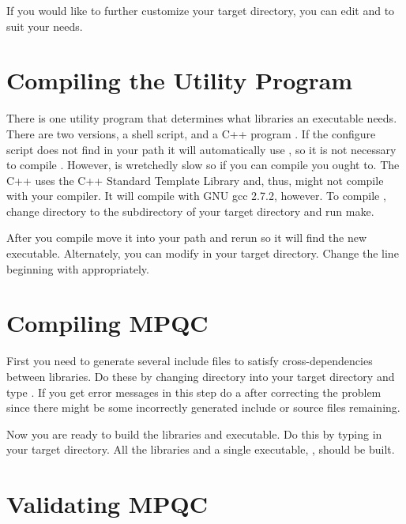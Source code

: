  If you would like to further customize your target directory,
you can edit  and  to
suit your needs.

\section{Compiling the Utility Program}

 There is one utility program that determines what libraries an executable
needs.  There are two versions, a shell script,  and a
C++ program .  If the configure script does not find
 in your path it will automatically use
, so it is not necessary to compile .
However,  is wretchedly slow so if you can compile
 you ought to.  The C++  uses the C++
Standard Template Library and, thus, might not compile with your compiler.
It will compile with GNU gcc 2.7.2, however.  To compile ,
change directory to the  subdirectory of your
target directory and run make.

 After you compile  move it into your path and
rerun  so it will find the new executable.  Alternately,
you can modify  in your target directory.
Change the line beginning with  appropriately.

\section{Compiling MPQC}

 First you need to generate several include files to satisfy
cross-dependencies between libraries.  Do these by changing directory into
your target directory and type .  If you get error
messages in this step do a  after correcting the
problem since there might be some incorrectly generated include or source
files remaining.

 Now you are ready to build the libraries and executable.  Do this
by typing  in your target directory.  All the libraries and
a single executable, , should be built.

\section{Validating MPQC}

